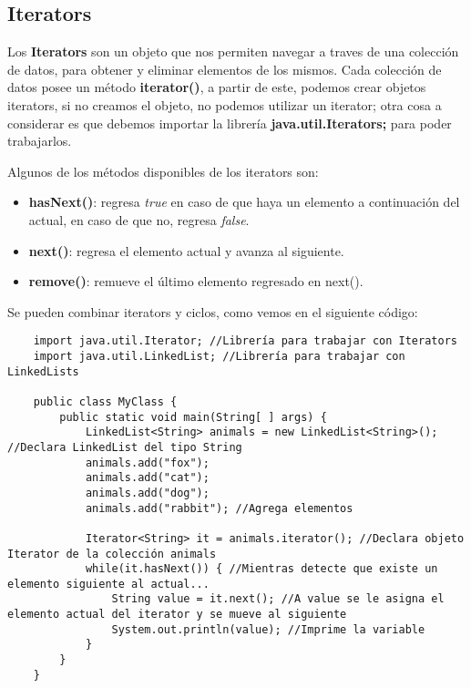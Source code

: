 \subsection{Iterators}
\hspace{0.55cm}Los \textbf{Iterators} son un objeto que nos permiten navegar a traves de una colección de datos, para obtener y eliminar elementos de los mismos. Cada colección de datos posee un método \textbf{iterator()}, a partir de este, podemos crear objetos iterators, si no creamos el objeto, no podemos utilizar un iterator; otra cosa a considerar es que debemos importar la librería \textbf{java.util.Iterators;} para poder trabajarlos.

Algunos de los métodos disponibles de los iterators son:
\begin{itemize}
    \item \textbf{hasNext()}: regresa \textit{true} en caso de que haya un elemento a continuación del actual, en caso de que no, regresa \textit{false}.
    \item \textbf{next()}: regresa el elemento actual y avanza al siguiente.
    \item \textbf{remove()}: remueve el último elemento regresado en next().
\end{itemize}

Se pueden combinar iterators y ciclos, como vemos en el siguiente código:
\begin{lstlisting}
    import java.util.Iterator; //Librería para trabajar con Iterators
    import java.util.LinkedList; //Librería para trabajar con LinkedLists

    public class MyClass {
        public static void main(String[ ] args) {
            LinkedList<String> animals = new LinkedList<String>(); //Declara LinkedList del tipo String
            animals.add("fox");
            animals.add("cat");
            animals.add("dog");
            animals.add("rabbit"); //Agrega elementos
        
            Iterator<String> it = animals.iterator(); //Declara objeto Iterator de la colección animals
            while(it.hasNext()) { //Mientras detecte que existe un elemento siguiente al actual...
                String value = it.next(); //A value se le asigna el elemento actual del iterator y se mueve al siguiente
                System.out.println(value); //Imprime la variable
            }
        }
    }
\end{lstlisting}



